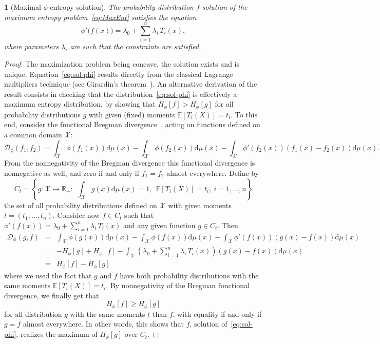 \documentclass[english,sort&compress]{elsarticle}
\theoremstyle{definition}
\theoremstyle{plain}
\newtheorem{prop}{\protect\propositionname}
\theoremstyle{plain}
\providecommand{\propositionname}{Proposition}
\def\dmu{\mathrm{d}\mu}
\def\fD{\mathcal{D}}
\def\Rset{\mathbb{R}}
\def\X{\mathcal{X}}
\newcommand{\Esp}[1]{\mathbb{E}\left[ #1 \right]}
\begin{document}
\begin{prop}[Maximal $\phi$-entropy solution]\label{prop:sol-phi}
  The   probability   distribution  $f$   solution   of   the  maximum   entropy
  problem~\eqref{eq:MaxEnt} satisfies the equation
  \begin{equation}\label{eq:sol-phi}
    \phi'\big(f(x)\big) = \lambda_0 + \sum_{i=1}^n \lambda_i \, T_i(x),
  \end{equation}
  where parameters $\lambda_i$ are such that the constraints are satisfied.
\end{prop}
%
\begin{proof}
  The maximization  problem being  concave, the solution  exists and  is unique.
  Equation~\eqref{eq:sol-phi}  results  directly  from  the  classical  Lagrange
  multipliers technique (see Girardin's theorem~\cite{Girardin}).
  An  alternative  derivation  of  the  result consists  in  checking  that  the
  distribution~\eqref{eq:sol-phi} is effectively a maximum entropy distribution,
  by showing that $H_\phi[f] >  H_\phi[g]$ for all probability distributions $g$
  with given  (fixed) moments $\Esp{T_i(X)} =  t_i$.  To this  end, consider the
  functional Bregman  divergence~\cite{Bas13}, acting on functions  defined on a
  common domain $\X$:
  \begin{equation}
  \label{eq:FctBregman}
  \fD_\phi(f_1,f_2)  =  \int_\X  \phi(f_1(x))  \dmu(x)  -  \int_\X  \phi(f_2(x))
  \dmu(x) - \int_\X \phi'(f_2(x)) \left( f_1(x) - f_2(x) \right) \dmu(x).
  \end{equation}
  From the nonnegativity of the Bregman divergence this functional divergence is
  nonnegative  as   well,  and  zero  if   and  only  if  $f_1   =  f_2$  almost
  everywhere. Define by
  \[
  C_t =  \left\{ g: \X  \mapsto \Rset_+  : \:\: \int_\X  g(x) \dmu(x) =  1, \:\:
    \Esp{T_i(X)} = t_i, \: i = 1, \ldots , n \right\}
  \]
  the set of all probability distributions defined on $\X$ with given moments $t
  =  (t_1,\ldots,t_n)$.  Consider  now  $f  \in C_t$  such  that $\phi'(f(x))  =
  {\displaystyle \lambda_0  + \sum_{i=1}^n \lambda_i  \, T_i(x)}$ and  any given
  function $g \in C_t$. Then
  \begin{eqnarray*}
  \fD_\phi(g,f) & = & \int_\X \phi(g(x)) \dmu(x) - \int_\X \phi(f(x)) \dmu(x) -
  \int_\X \phi'(f(x)) \left( g(x) - f(x) \right) \dmu(x)
  \\[2mm]
  & = & - H_\phi[g] + H_\phi[f] - \int_\X \left( \lambda_0 + \sum_{i=1}^n
  \lambda_i \, T_i(x) \right) \left( g(x) - f(x) \right) \dmu(x)
  \\[2mm]
  & = & H_\phi[f] - H_\phi[g]
  \end{eqnarray*}
  where  we  used the  fact  that $g$  and  $f$  have both  probability
  distributions with the same moments $\Esp{T_i(X)} = t_i$.  By nonnegativity of
  the Bregman functional divergence, we finally get that
  \[
  H_\phi[f] \ge H_\phi[g]
  \]
  for all distribution $g$ with the  same moments $t$ than $f$, with equality if
  and only if $g  = f$ almost everywhere.  In other words,  this shows that $f$,
  solution  of~\eqref{eq:sol-phi},  realizes  the  maximum of  $H_\phi[g]$  over
  $C_t$.
\end{proof}
\end{document}
